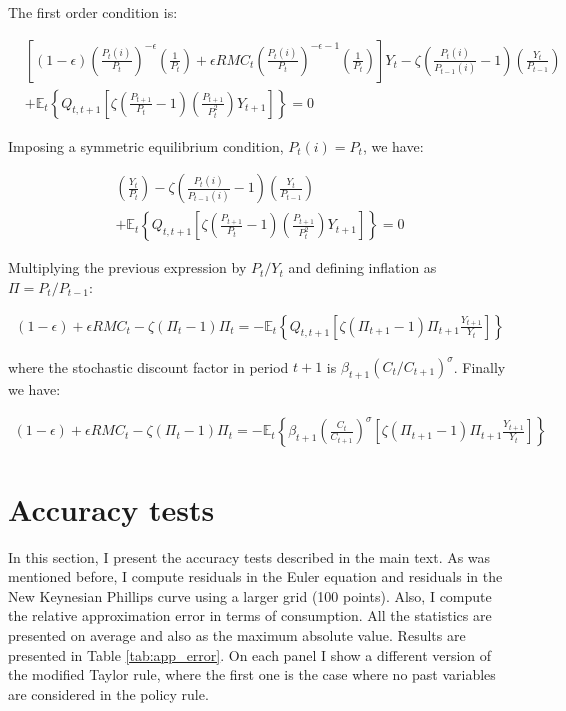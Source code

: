 \documentclass[12pt]{article}
\numberwithin{equation}{section}
\begin{document}
The first order condition is:

\begin{align*}
&\left[(1-\epsilon)\left(\frac{P_{t}(i)}{P_{t}}\right)^{-\epsilon}\left(\frac{1}{P_t}\right)+\epsilon RMC_t \left(\frac{P_{t}(i)}{P_{t}}\right)^{-\epsilon-1}\left(\frac{1}{P_t}\right)\right]Y_t-\zeta\left(\frac{P_t(i)}{P_{t-1}(i)}-1\right)\left(\frac{Y_t}{P_{t-1}}\right)\\
&+\mathbb{E}_t\left\{Q_{t,t+1}\left[\zeta\left(\frac{P_{t+1}}{P_t}-1\right)\left(\frac{P_{t+1}}{P_t^2}\right)Y_{t+1}\right]\right\}=0
\end{align*}

Imposing a symmetric equilibrium condition, $P_t(i)=P_t$, we have:

\begin{align*}
[(1-\epsilon)+\epsilon RMC_t]\left(\frac{Y_t}{P_t}\right)-\zeta\left(\frac{P_t(i)}{P_{t-1}(i)}-1\right)\left(\frac{Y_t}{P_{t-1}}\right)\\
+\mathbb{E}_t\left\{Q_{t,t+1}\left[\zeta\left(\frac{P_{t+1}}{P_t}-1\right)\left(\frac{P_{t+1}}{P_t^2}\right)Y_{t+1}\right]\right\}=0
\end{align*}

Multiplying the previous expression by $P_t/Y_t$ and defining inflation as $\Pi=P_t/P_{t-1}$:

\begin{align*}
(1-\epsilon)+\epsilon RMC_t-\zeta(\Pi_t-1)\Pi_t=-\mathbb{E}_t\left\{Q_{t,t+1}\left[\zeta(\Pi_{t+1}-1)\Pi_{t+1}\frac{Y_{t+1}}{Y_t}\right]\right\}
\end{align*}

where the stochastic discount factor in period $t+1$ is $\beta_{t+1}(C_t/C_{t+1})^{\sigma}$. Finally we have:

\begin{align*}
(1-\epsilon)+\epsilon RMC_t-\zeta(\Pi_t-1)\Pi_t=-\mathbb{E}_t\left\{\beta_{t+1}\left(\frac{C_t}{C_{t+1}}\right)^{\sigma}\left[\zeta(\Pi_{t+1}-1)\Pi_{t+1}\frac{Y_{t+1}}{Y_t}\right]\right\}
\end{align*}

\section{Accuracy tests}\label{app:accuracy}
	
In this section, I present the accuracy tests described in the main text. As was mentioned before, I compute residuals in the Euler equation and residuals in the New Keynesian Phillips curve using a larger grid (100 points). Also, I compute the relative approximation error in terms of consumption. All the statistics are presented on average and also as the maximum absolute value. Results are presented in Table \ref{tab:app_error}. On each panel I show a different version of the modified Taylor rule, where the first one is the case where no past variables are considered in the policy rule.


	
\end{document}
